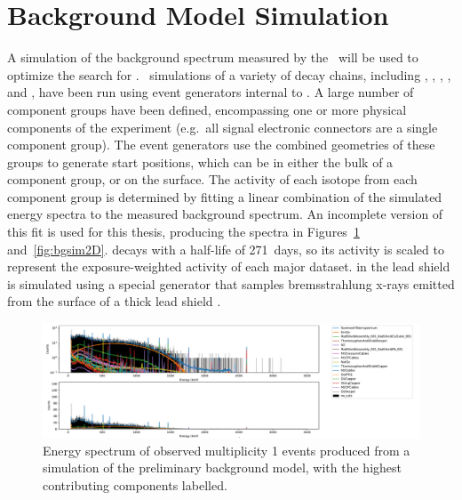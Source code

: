 \documentclass[/main.tex]{subfiles}
\begin{document}
\section{Background Model Simulation}
A simulation of the background spectrum measured by the \MJD\ will be used to optimize the search for \bbes.
\Mage\ simulations of a variety of decay chains, including , , , ,  and , have been run using event generators internal to \geant.
A large number of component groups have been defined, encompassing one or more physical components of the experiment (e.g.~all signal electronic connectors are a single component group).
The event generators use the combined geometries of these groups to generate start positions, which can be in either the bulk of a component group, or on the surface.
The activity of each isotope from each component group is determined by fitting a linear combination of the simulated energy spectra to the measured background spectrum.
An incomplete version of this fit is used for this thesis, producing the spectra in Figures~\ref{fig:bgsim1D} and~\ref{fig:bgsim2D}\cite{buuck2019}.
 decays with a half-life of 271~days, so its activity is scaled to represent the exposure-weighted activity of each major dataset.
 in the lead shield is simulated using a special generator that samples bremsstrahlung x-rays emitted from the surface of a thick lead shield \cite{VOJTYLA1996}.

\begin{figure}
  \centering
  \includegraphics[width=1\linewidth]{BGsim1D}
  \caption[Simulation of multiplicty 1 events from the background model]{\label{fig:bgsim1D}
    Energy spectrum of observed multiplicity 1 events produced from a simulation of the preliminary background model, with the highest contributing components labelled.
  }
\end{figure}
\end{document}
